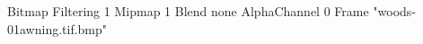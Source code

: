 {Bitmap
	{Filtering 1}
	{Mipmap 1}
	{Blend none}
	{AlphaChannel 0}
	{Frame "woods-01awning.tif.bmp"}
}
